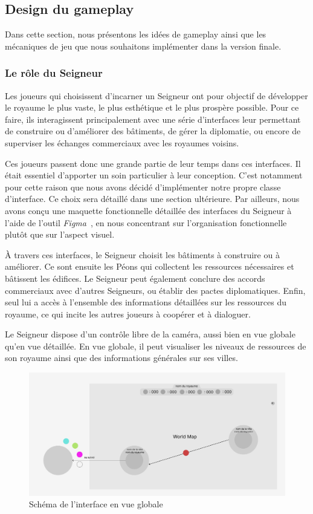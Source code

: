 \subsection{Design du gameplay}

Dans cette section, nous présentons les idées de gameplay ainsi que les mécaniques de jeu que nous souhaitons implémenter dans la version finale.

\subsubsection{Le rôle du Seigneur}

Les joueurs qui choisissent d'incarner un Seigneur ont pour objectif de développer le royaume le plus vaste, le plus esthétique et le plus prospère possible. Pour ce faire, ils interagissent principalement avec une série d'interfaces leur permettant de construire ou d'améliorer des bâtiments, de gérer la diplomatie, ou encore de superviser les échanges commerciaux avec les royaumes voisins.

Ces joueurs passent donc une grande partie de leur temps dans ces interfaces. Il était essentiel d’apporter un soin particulier à leur conception. C’est notamment pour cette raison que nous avons décidé d’implémenter notre propre classe d’interface. Ce choix sera détaillé dans une section ultérieure. Par ailleurs, nous avons conçu une maquette fonctionnelle détaillée des interfaces du Seigneur à l’aide de l’outil \textit{Figma}~\cite{figma}, en nous concentrant sur l’organisation fonctionnelle plutôt que sur l’aspect visuel.

À travers ces interfaces, le Seigneur choisit les bâtiments à construire ou à améliorer. Ce sont ensuite les Péons qui collectent les ressources nécessaires et bâtissent les édifices. Le Seigneur peut également conclure des accords commerciaux avec d'autres Seigneurs, ou établir des pactes diplomatiques. Enfin, seul lui a accès à l’ensemble des informations détaillées sur les ressources du royaume, ce qui incite les autres joueurs à coopérer et à dialoguer.

Le Seigneur dispose d’un contrôle libre de la caméra, aussi bien en vue globale qu’en vue détaillée. En vue globale, il peut visualiser les niveaux de ressources de son royaume ainsi que des informations générales sur ses villes.

\begin{figure}[!h]
    \centering
    \includegraphics[width=0.7\linewidth]{images/figma_general.png}
    \caption{Schéma de l'interface en vue globale}
    \label{fig:figma-global}
\end{figure}


